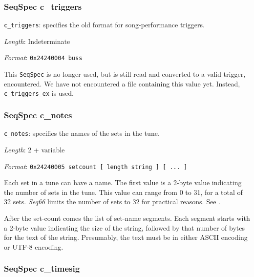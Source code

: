 \subsubsection{SeqSpec c\_triggers}
\label{subsubsec:midi_format_track_seqspec_triggers}


   \begin{description}
      \item \texttt{c\_triggers}:
         specifies the old format for song-performance triggers.
      \item \textsl{Length}: Indeterminate
      \item \textsl{Format}: \texttt{0x24240004 buss}
   \end{description}

   This \texttt{SeqSpec} is no longer used, but is still read and
   converted to a valid trigger, encountered.
   We have not encountered a file containing this value yet.
   Instead, \texttt{c\_triggers\_ex} is used.

\subsubsection{SeqSpec c\_notes}
\label{subsubsec:midi_format_track_seqspec_notes}


   \begin{description}
      \item \texttt{c\_notes}: specifies the names of the sets in the tune.
      \item \textsl{Length}: 2 + variable
      \item \textsl{Format}: \texttt{0x24240005 setcount [ length string ] [ ... ] }
   \end{description}

   Each set in a tune can have a name.  The first value is a 2-byte value
   indicating the number of sets in the tune.  This value can range from
   0 to 31, for a total of 32 sets.
   \textsl{Seq66} limits the number of sets to 32 for practical reasons.
   See .

   After the set-count comes the list of set-name segments.  Each segment
   starts with a 2-byte value indicating the size of the string, followed
   by that number of bytes for the text of the string.  Presumably, the
   text must be in either ASCII encoding or UTF-8 encoding.

\subsubsection{SeqSpec c\_timesig}
\label{subsubsec:midi_format_track_seqspec_timesig}

